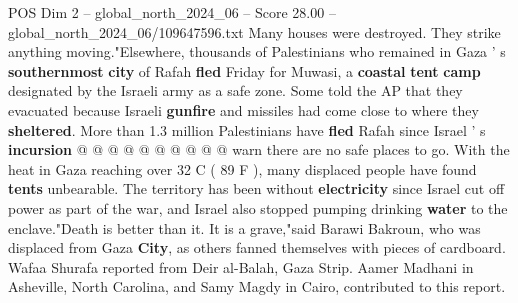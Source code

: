 \begin{textsample}{POS Dim 2 – global\_north\_2024\_06 – Score 28.00 – global\_north\_2024\_06/109647596.txt}
Many houses were destroyed.
They strike anything moving."Elsewhere, thousands of Palestinians who remained in Gaza ' s \textbf{southernmost} \textbf{city} of Rafah \textbf{fled} Friday for Muwasi, a \textbf{coastal} \textbf{tent} \textbf{camp} designated by the Israeli army as a safe zone.
Some told the AP that they evacuated because Israeli \textbf{gunfire} and missiles had come close to where they \textbf{sheltered}.
More than 1.3 million Palestinians have \textbf{fled} Rafah since Israel ' s \textbf{incursion} @ @ @ @ @ @ @ @ @ @ warn there are no safe places to go.
With the heat in Gaza reaching over 32 C ( 89 F ), many displaced people have found \textbf{tents} unbearable.
The territory has been without \textbf{electricity} since Israel cut off power as part of the war, and Israel also stopped pumping drinking \textbf{water} to the enclave."Death is better than it.
It is a grave,"said Barawi Bakroun, who was displaced from Gaza \textbf{City}, as others fanned themselves with pieces of cardboard.
Wafaa Shurafa reported from Deir al-Balah, Gaza Strip.
Aamer Madhani in Asheville, North Carolina, and Samy Magdy in Cairo, contributed to this report.

\end{textsample}
